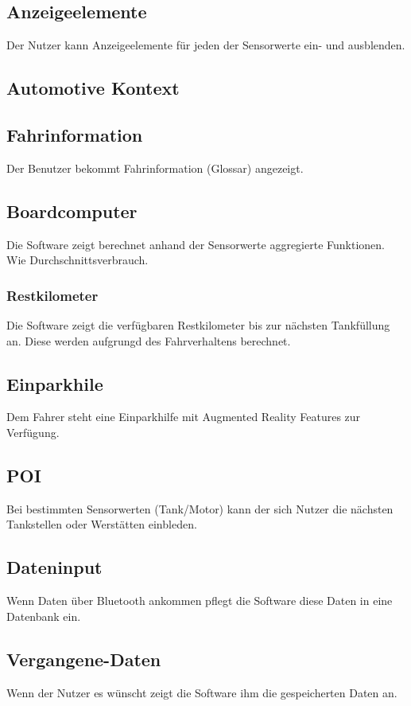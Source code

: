 \documentclass[pflichtenheft.tex]{subfiles}
\begin{document}
\subsection{\mkfa Anzeigeelemente} Der Nutzer kann Anzeigeelemente für jeden der Sensorwerte ein- und ausblenden.

\subsection{Automotive Kontext}

\subsection{\mkfa Fahrinformation} Der Benutzer bekommt Fahrinformation (Glossar) angezeigt.

\subsection{\mkfa Boardcomputer} Die Software zeigt berechnet anhand der Sensorwerte aggregierte Funktionen. Wie Durchschnittsverbrauch.

\subsubsection{\mkfa Restkilometer} Die Software zeigt die verfügbaren Restkilometer bis zur nächsten Tankfüllung an. Diese werden aufgrungd des Fahrverhaltens berechnet.

\subsection{\mkfa Einparkhile} Dem Fahrer steht eine Einparkhilfe mit Augmented Reality Features zur Verfügung.

\subsection{\mkfa POI} Bei bestimmten Sensorwerten (Tank/Motor) kann der sich Nutzer die nächsten Tankstellen oder Werstätten einbleden.

\subsection{\mkfa Dateninput}
Wenn Daten über Bluetooth ankommen pflegt die Software diese Daten in eine Datenbank ein. 
\subsection{\mkfa Vergangene-Daten}
Wenn der Nutzer es wünscht zeigt die Software ihm die gespeicherten Daten an.
\end{document}
